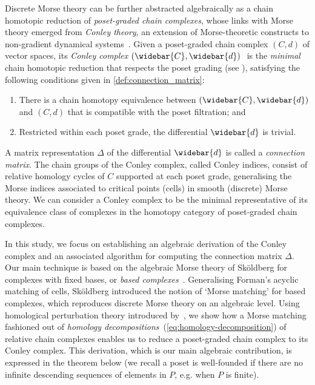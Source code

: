 \documentclass[11pt, table, nothms]{amsart}
\theoremstyle{definition}
\newcommand{\M}{\mathcal{M}}
\newcommand{\oC}{\widebar{C}}
\newcommand{\od}{\widebar{d}}
\begin{document}
Discrete Morse theory can be further abstracted algebraically as a chain homotopic reduction of \emph{poset-graded chain complexes}, whose links with Morse theory emerged from \emph{Conley theory}, an extension of Morse-theoretic constructs to non-gradient dynamical systems~\cite{Franzosa,Robbin1992LyapunovFunctor}. 
Given a poset-graded chain complex $(C,d)$ of vector spaces, its \emph{Conley complex} $(\oC, \od)~$\cite[Def.~4.23]{harker2021}  is the \emph{minimal} chain homotopic reduction that respects the poset grading (see ), satisfying the following conditions  given in \cref{def:connection_matrix}:
\begin{enumerate}
    \item There is a chain homotopy equivalence between $(\oC, \od)$ and $(C, d)$ that is compatible with the poset filtration; and
    \item Restricted within each poset grade, the differential $\od$ is trivial.
\end{enumerate}
A matrix {representation $\Delta$ of the differential} $\od$ is called a \emph{connection matrix}.  
The chain groups of the Conley complex, called Conley indices, consist of relative homology cycles of $C$ supported at each poset grade, generalising the Morse indices associated to critical points (cells) in smooth (discrete) Morse theory. We can consider a Conley complex to be the minimal representative of its equivalence class of complexes in the homotopy category of poset-graded chain complexes.  


In this study, we focus on establishing an algebraic derivation of the Conley complex and an associated algorithm for computing the connection matrix {$\Delta$}. %
Our main  technique is based on the algebraic Morse theory of Sk\"oldberg  for complexes with fixed bases, or \emph{based complexes}~\cite{Skoldberg2006MorseViewpoint,Skoldberg2018}. Generalising Forman's acyclic matching of cells, Sk\"oldberg introduced the notion of `Morse matching' for based complexes, which reproduces discrete Morse theory on an algebraic level. Using homological perturbation theory introduced by~\cite{Brown1965TheTheorem, Gugenheim1972OnFibration}, we show how a Morse matching fashioned out of \emph{homology decompositions}~(\cref{eq:homology-decomposition}) of relative chain complexes enables us to reduce a poset-graded chain complex to its Conley complex. This derivation, which is our main algebraic contribution, is expressed in the theorem below (we recall a poset is well-founded if there are no infinite descending sequences of elements in $P$, e.g. when $P$ is finite).
\end{document}
